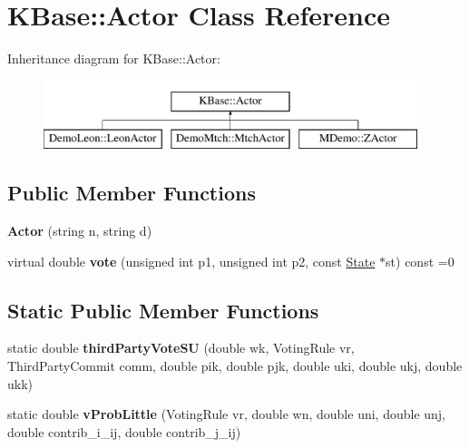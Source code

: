 \hypertarget{class_k_base_1_1_actor}{\section{K\-Base\-:\-:Actor Class Reference}
\label{class_k_base_1_1_actor}
}
Inheritance diagram for K\-Base\-:\-:Actor\-:\begin{figure}[H]
\begin{center}
\leavevmode
\includegraphics[height=2.000000cm]{class_k_base_1_1_actor}
\end{center}
\end{figure}
\subsection*{Public Member Functions}
\begin{DoxyCompactItemize}
\item 
\hypertarget{class_k_base_1_1_actor_aa1c1b27eea39d8f6d4880956dbb84e0c}{{\bfseries Actor} (string n, string d)}\label{class_k_base_1_1_actor_aa1c1b27eea39d8f6d4880956dbb84e0c}

\item 
\hypertarget{class_k_base_1_1_actor_a4b2e4d5d1e01cd57cfd9838cb4903b31}{virtual double {\bfseries vote} (unsigned int p1, unsigned int p2, const \hyperlink{class_k_base_1_1_state}{State} $\ast$st) const =0}\label{class_k_base_1_1_actor_a4b2e4d5d1e01cd57cfd9838cb4903b31}

\end{DoxyCompactItemize}
\subsection*{Static Public Member Functions}
\begin{DoxyCompactItemize}
\item 
\hypertarget{class_k_base_1_1_actor_a8009ca163b06a0ed5887d49b2b2b552f}{static double {\bfseries third\-Party\-Vote\-S\-U} (double wk, Voting\-Rule vr, Third\-Party\-Commit comm, double pik, double pjk, double uki, double ukj, double ukk)}\label{class_k_base_1_1_actor_a8009ca163b06a0ed5887d49b2b2b552f}

\item 
\hypertarget{class_k_base_1_1_actor_acaff87e7fbc1a74824c61012039e7cc5}{static double {\bfseries v\-Prob\-Little} (Voting\-Rule vr, double wn, double uni, double unj, double contrib\-\_\-i\-\_\-ij, double contrib\-\_\-j\-\_\-ij)}\label{class_k_base_1_1_actor_acaff87e7fbc1a74824c61012039e7cc5}

\end{DoxyCompactItemize}
